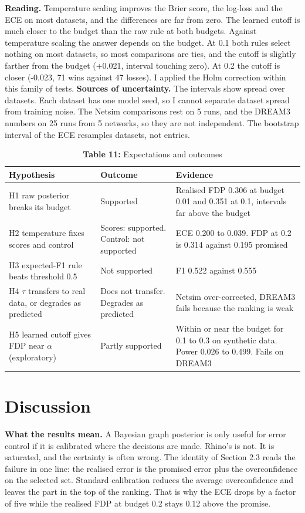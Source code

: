 \documentclass[10pt]{article}
\begin{document}
\textbf{Reading.} Temperature scaling improves the Brier score, the log-loss and the ECE on most datasets, and the differences are far from zero. The learned cutoff is much closer to the budget than the raw rule at both budgets. Against temperature scaling the answer depends on the budget. At 0.1 both rules select nothing on most datasets, so most comparisons are ties, and the cutoff is slightly farther from the budget (+0.021, interval touching zero). At 0.2 the cutoff is closer (-0.023, 71 wins against 47 losses). I applied the Holm correction within this family of tests. \textbf{Sources of uncertainty.} The intervals show spread over datasets. Each dataset has one model seed, so I cannot separate dataset spread from training noise. The Netsim comparisons rest on 5 runs, and the DREAM3 numbers on 25 runs from 5 networks, so they are not independent. The bootstrap interval of the ECE resamples datasets, not entries.

\begin{table}[!ht]\centering
\captionsetup{type=table}\caption*{\textbf{Table 11:} Expectations and outcomes}
\footnotesize
\begin{tabular}{>{\raggedright\arraybackslash}p{1.77in}>{\raggedright\arraybackslash}p{1.29in}>{\raggedright\arraybackslash}p{2.17in}}\toprule
\textbf{Hypothesis} & \textbf{Outcome} & \textbf{Evidence} \\ \midrule
H1 raw posterior breaks its budget & Supported & Realised FDP 0.306 at budget 0.01 and 0.351 at 0.1, intervals far above the budget \\
H2 temperature fixes scores and control & Scores: supported. Control: not supported & ECE 0.200 to 0.039. FDP at 0.2 is 0.314 against 0.195 promised \\
H3 expected-F1 rule beats threshold 0.5 & Not supported & F1 0.522 against 0.555 \\
H4 $\tau$ transfers to real data, or degrades as predicted & Does not transfer. Degrades as predicted & Netsim over-corrected, DREAM3 fails because the ranking is weak \\
H5 learned cutoff gives FDP near $\alpha$ (exploratory) & Partly supported & Within or near the budget for 0.1 to 0.3 on synthetic data. Power 0.026 to 0.499. Fails on DREAM3 \\
\bottomrule\end{tabular}
\end{table}
\section{Discussion}
\textbf{What the results mean.} A Bayesian graph posterior is only useful for error control if it is calibrated where the decisions are made. Rhino's is not. It is saturated, and the certainty is often wrong. The identity of Section 2.3 reads the failure in one line: the realised error is the promised error plus the overconfidence on the selected set. Standard calibration reduces the average overconfidence and leaves the part in the top of the ranking. That is why the ECE drops by a factor of five while the realised FDP at budget 0.2 stays 0.12 above the promise.
\end{document}
